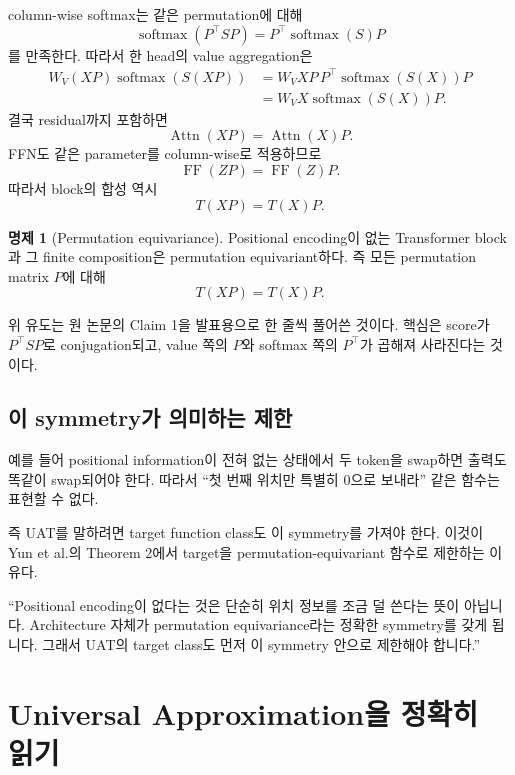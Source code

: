 \documentclass[11pt,a4paper,oneside,openany]{memoir}
\newcommand{\softmax}{\operatorname{softmax}}
\newcommand{\Attn}{\operatorname{Attn}}
\newcommand{\FF}{\operatorname{FF}}
\theoremstyle{definition}
\newtheorem{proposition}{명제}[chapter]
\begin{document}
column-wise softmax는 같은 permutation에 대해
\[
\softmax(P^\top SP)=P^\top\softmax(S)P
\]
를 만족한다. 따라서 한 head의 value aggregation은
\begin{align*}
W_V(XP)\softmax(S(XP))
&=W_VXP\,P^\top\softmax(S(X))P\\
&=W_VX\softmax(S(X))P.
\end{align*}
결국 residual까지 포함하면
\[
\Attn(XP)=\Attn(X)P.
\]
FFN도 같은 parameter를 column-wise로 적용하므로
\[
\FF(ZP)=\FF(Z)P.
\]
따라서 block의 합성 역시
\[
T(XP)=T(X)P.
\]

\begin{proposition}[Permutation equivariance]
Positional encoding이 없는 Transformer block과 그 finite composition은 permutation equivariant하다.
즉 모든 permutation matrix $P$에 대해
\[
T(XP)=T(X)P.
\]
\end{proposition}

\begin{suppbox}
위 유도는 원 논문의 Claim 1을 발표용으로 한 줄씩 풀어쓴 것이다. 핵심은 score가 $P^\top SP$로 conjugation되고,
value 쪽의 $P$와 softmax 쪽의 $P^\top$가 곱해져 사라진다는 것이다.
\end{suppbox}

\section{이 symmetry가 의미하는 제한}

예를 들어 positional information이 전혀 없는 상태에서 두 token을 swap하면 출력도 똑같이 swap되어야 한다.
따라서 ``첫 번째 위치만 특별히 0으로 보내라'' 같은 함수는 표현할 수 없다.

즉 UAT를 말하려면 target function class도 이 symmetry를 가져야 한다.
이것이 Yun et al.의 Theorem 2에서 target을 permutation-equivariant 함수로 제한하는 이유다.

\begin{presentbox}
``Positional encoding이 없다는 것은 단순히 위치 정보를 조금 덜 쓴다는 뜻이 아닙니다. Architecture 자체가 permutation equivariance라는 정확한 symmetry를 갖게 됩니다. 그래서 UAT의 target class도 먼저 이 symmetry 안으로 제한해야 합니다.''
\end{presentbox}

\chapter{Universal Approximation을 정확히 읽기}
\end{document}
